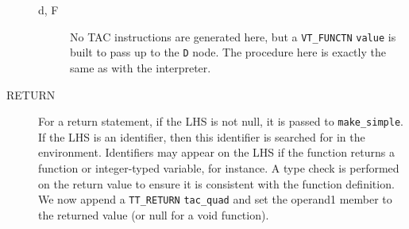 \begin{description}
\begin{description}
			\item[d, F] No TAC instructions are generated here, but a \verb!VT_FUNCTN! \verb!value! is built to pass up to the \verb!D! node. The procedure here is exactly the same as with the interpreter.
		\end{description}
	\item[RETURN] For a return statement, if the LHS is not null, it is passed to \verb!make_simple!. If the LHS is an identifier, then this identifier is searched for in the environment. Identifiers may appear on the LHS if the function returns a function or integer-typed variable, for instance. A type check is performed on the return value to ensure it is consistent with the function definition. We now append a \verb!TT_RETURN! \verb!tac_quad! and set the operand1 member to the returned value (or null for a void function).
\end{description}

